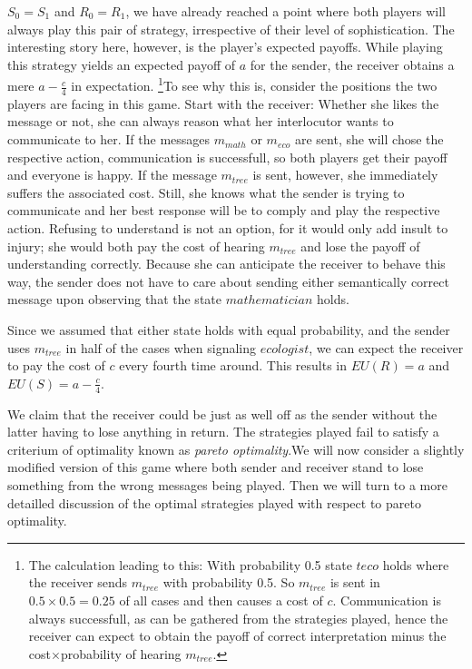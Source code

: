 \documentclass[10]{article}
\begin{document}
$S_0=S_1$ and $R_0=R_1$, we have already reached a point where both players will always play this pair of strategy, irrespective of their level of sophistication. The interesting story here, however, is the player's expected payoffs. While playing this strategy yields an expected payoff of $a$ for the sender, the receiver obtains a mere $a-\tfrac{c}{4}$ in expectation.
\footnote{The calculation leading to this: With probability 0.5 state $t{eco}$ holds where the receiver sends $m_{tree}$ with probability 0.5. So $m_{tree}$ is sent in $0.5\times 0.5 =0.25$ of all cases and then causes a cost of $c$. Communication is always successfull, as can be gathered from the strategies played, hence the receiver can expect to obtain the payoff of correct interpretation minus the cost$\times$probability of hearing $m_{tree}$.}To see why this is, consider the positions the two players are facing in this game. Start with the receiver: Whether she likes the message or not, she can always reason what her interlocutor wants to communicate to her. If the messages $m_{math}$ or $m_{eco}$ are sent, she will chose the respective action, communication is successfull, so both players get their payoff and everyone is happy. If the message $m_{tree}$ is sent, however, she immediately suffers the associated cost. Still, she knows what the sender is trying to communicate and her best response will be to comply and play the respective action. Refusing to understand is not an option, for it would only add insult to injury; she would both pay the cost of hearing $m_{tree}$ and lose the payoff of understanding correctly. Because she can anticipate the receiver to behave this way, the sender does not have to care about sending either semantically correct message upon observing that the state $mathematician$ holds.

Since we assumed that either state holds with equal probability, and the sender uses $m_{tree}$ in half of the cases when signaling $ecologist$, we can expect the receiver to pay the cost of $c$ every fourth time around. This results in $EU(R)=a$ and $EU(S)=a-\tfrac{c}{4}$.

We claim that the receiver could be just as well off as the sender without the latter having to lose anything in return. The strategies played fail to satisfy a criterium of optimality known as \textit{pareto optimality}.We will now consider a slightly modified version of this game where both sender and receiver stand to lose something from the wrong messages being played. Then we will turn to a more detailled discussion of the optimal strategies played with respect to pareto optimality.
\end{document}
